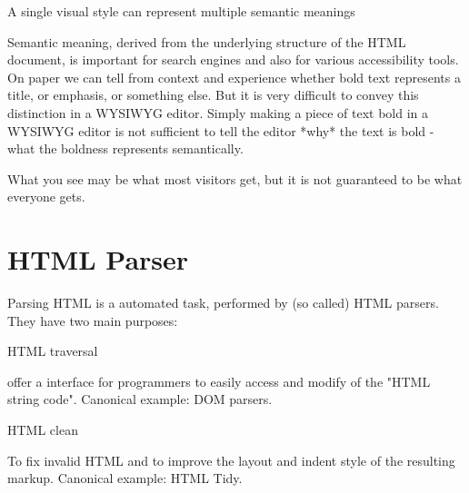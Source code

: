 \begin{compactitem}
\item A single visual style can represent multiple semantic meanings

Semantic meaning, derived from the underlying structure of the HTML document, is important for search engines and also for various accessibility tools. On paper we can tell from context and experience whether bold text represents a title, or emphasis, or something else. But it is very difficult to convey this distinction in a WYSIWYG editor. Simply making a piece of text bold in a WYSIWYG editor is not sufficient to tell the editor *why* the text is bold - what the boldness represents semantically.

\end{compactitem}

What you see may be what most visitors get, but it is not guaranteed to be what everyone gets.



\chapter{HTML Parser}

Parsing HTML is a automated task, performed by (so called) HTML parsers. They have two main purposes:

\begin{compactitem}
\item HTML traversal

offer a interface for programmers to easily access and modify of the "HTML string code". Canonical example: DOM parsers.
\item HTML clean

To fix invalid HTML and to improve the layout and indent style of the resulting markup. Canonical example: HTML Tidy.
\end{compactitem}







































